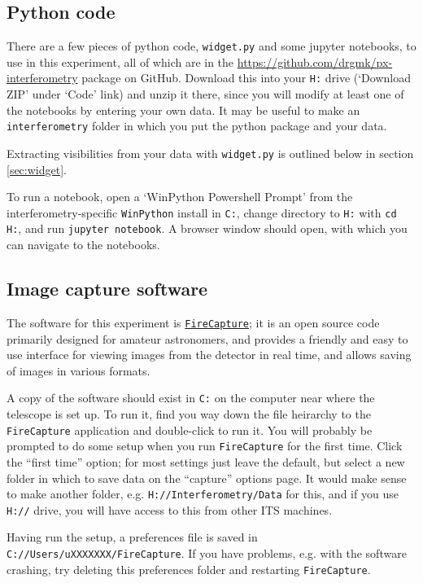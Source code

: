 \documentclass[11pt]{article}
\begin{document}
\subsection{Python code}

There are a few pieces of python code, \texttt{widget.py} and some jupyter notebooks, to use in this experiment, all of which are in the \href{https://github.com/drgmk/px-interferometry}{https://github.com/drgmk/px-interferometry} package on GitHub. Download this into your \texttt{H:} drive (`Download ZIP' under `Code' link) and unzip it there, since you will modify at least one of the notebooks by entering your own data. It may be useful to make an \texttt{interferometry} folder in which you put the python package and your data.

Extracting visibilities from your data with \texttt{widget.py} is outlined below in section \ref{sec:widget}.

To run a notebook, open a `WinPython Powershell Prompt' from the interferometry-specific \texttt{WinPython} install in \texttt{C:}, change directory to \texttt{H:} with \texttt{cd H:}, and run \texttt{jupyter notebook}. A browser window should open, with which you can navigate to the notebooks.

\subsection{Image capture software}\label{sec:software}

The software for this experiment is \href{http://www.firecapture.de/}{\texttt{FireCapture}}; it is an open source code primarily designed for amateur astronomers, and provides a friendly and easy to use interface for viewing images from the detector in real time, and allows saving of images in various formats.

A copy of the software should exist in \texttt{C:} on the computer near where the telescope is set up. To run it, find you way down the file heirarchy to the \texttt{FireCapture} application and double-click to run it. You will probably be prompted to do some setup when you run \texttt{FireCapture} for the first time. Click the ``first time'' option; for most settings just leave the default, but select a new folder in which to save data on the ``capture'' options page. It would make sense to make another folder, e.g. \texttt{H://Interferometry/Data} for this, and if you use \texttt{H://} drive, you will have access to this from other ITS machines.

Having run the setup, a preferences file is saved in \texttt{C://Users/uXXXXXXX/FireCapture}. If you have problems, e.g. with the software crashing, try deleting this preferences folder and restarting \texttt{FireCapture}.
\end{document}
